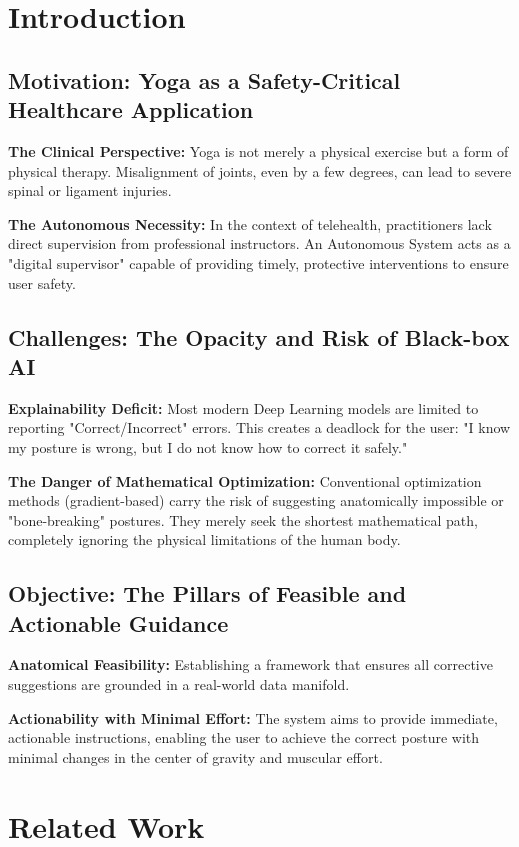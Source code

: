 \documentclass[pdflatex,sn-mathphys-num]{sn-jnl}%
\theoremstyle{thmstyleone}%
\theoremstyle{thmstyletwo}%
\theoremstyle{thmstylethree}%
\begin{document}
\section{Introduction}\label{sec:intro}

\subsection{Motivation: Yoga as a Safety-Critical Healthcare Application}
\textbf{The Clinical Perspective:} Yoga is not merely a physical exercise but a form of physical therapy. Misalignment of joints, even by a few degrees, can lead to severe spinal or ligament injuries. 

\textbf{The Autonomous Necessity:} In the context of telehealth, practitioners lack direct supervision from professional instructors. An Autonomous System acts as a "digital supervisor" capable of providing timely, protective interventions to ensure user safety.

\subsection{Challenges: The Opacity and Risk of Black-box AI}
\textbf{Explainability Deficit:} Most modern Deep Learning models are limited to reporting "Correct/Incorrect" errors. This creates a deadlock for the user: "I know my posture is wrong, but I do not know how to correct it safely."

\textbf{The Danger of Mathematical Optimization:} Conventional optimization methods (gradient-based) carry the risk of suggesting anatomically impossible or "bone-breaking" postures. They merely seek the shortest mathematical path, completely ignoring the physical limitations of the human body.

\subsection{Objective: The Pillars of Feasible and Actionable Guidance}
\textbf{Anatomical Feasibility:} Establishing a framework that ensures all corrective suggestions are grounded in a real-world data manifold.

\textbf{Actionability with Minimal Effort:} The system aims to provide immediate, actionable instructions, enabling the user to achieve the correct posture with minimal changes in the center of gravity and muscular effort.

\section{Related Work}\label{sec:related}
\end{document}
